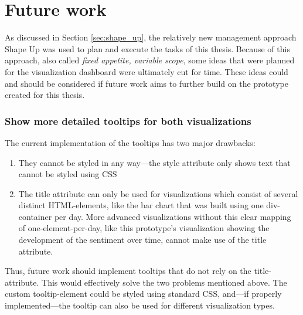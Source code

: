 \section{Future work}\label{sec:cutForTime}
As discussed in Section \ref{sec:shape_up}, the relatively new management approach Shape Up was used to plan and execute the tasks of this thesis. Because of this approach, also called \emph{fixed appetite, variable scope}, some ideas that were planned for the visualization dashboard were ultimately cut for time. These ideas could and should be considered if future work aims to further build on the prototype created for this thesis.

\subsubsection*{Show more detailed tooltips for both visualizations}\label{fw_tooltips}
The current implementation of the tooltips has two major drawbacks:
\begin{enumerate}
    \item They cannot be styled in any way---the style attribute only shows text that cannot be styled using CSS
    \item The title attribute can only be used for visualizations which consist of several distinct HTML-elements, like the bar chart that was built using one div-container per day. More advanced visualizations without this clear mapping of one-element-per-day, like this prototype's visualization showing the development of the sentiment over time, cannot make use of the title attribute.
\end{enumerate}

Thus, future work should implement tooltips that do not rely on the title-attribute. This would effectively solve the two problems mentioned above. The custom tooltip-element could be styled using standard CSS, and---if properly implemented---the tooltip can also be used for different visualization types. 

